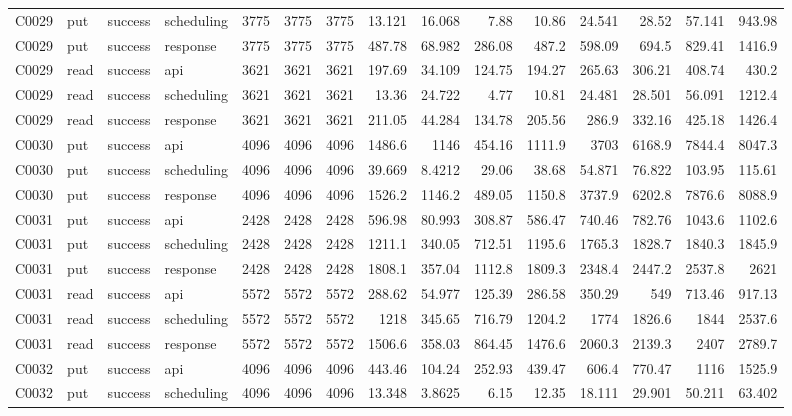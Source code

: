 \begin{landscape}
\begin{longtable}{llllrrrrrrrrrrr}
C0029 & put & success & scheduling & 3775 & 3775 & 3775 & 13.121 & 16.068 & 7.88 & 10.86 & 24.541 & 28.52 & 57.141 & 943.98\\
C0029 & put & success & response & 3775 & 3775 & 3775 & 487.78 & 68.982 & 286.08 & 487.2 & 598.09 & 694.5 & 829.41 & 1416.9\\
C0029 & read & success & api & 3621 & 3621 & 3621 & 197.69 & 34.109 & 124.75 & 194.27 & 265.63 & 306.21 & 408.74 & 430.2\\
C0029 & read & success & scheduling & 3621 & 3621 & 3621 & 13.36 & 24.722 & 4.77 & 10.81 & 24.481 & 28.501 & 56.091 & 1212.4\\
C0029 & read & success & response & 3621 & 3621 & 3621 & 211.05 & 44.284 & 134.78 & 205.56 & 286.9 & 332.16 & 425.18 & 1426.4\\
C0030 & put & success & api & 4096 & 4096 & 4096 & 1486.6 & 1146 & 454.16 & 1111.9 & 3703 & 6168.9 & 7844.4 & 8047.3\\
C0030 & put & success & scheduling & 4096 & 4096 & 4096 & 39.669 & 8.4212 & 29.06 & 38.68 & 54.871 & 76.822 & 103.95 & 115.61\\
C0030 & put & success & response & 4096 & 4096 & 4096 & 1526.2 & 1146.2 & 489.05 & 1150.8 & 3737.9 & 6202.8 & 7876.6 & 8088.9\\
C0031 & put & success & api & 2428 & 2428 & 2428 & 596.98 & 80.993 & 308.87 & 586.47 & 740.46 & 782.76 & 1043.6 & 1102.6\\
C0031 & put & success & scheduling & 2428 & 2428 & 2428 & 1211.1 & 340.05 & 712.51 & 1195.6 & 1765.3 & 1828.7 & 1840.3 & 1845.9\\
C0031 & put & success & response & 2428 & 2428 & 2428 & 1808.1 & 357.04 & 1112.8 & 1809.3 & 2348.4 & 2447.2 & 2537.8 & 2621\\
C0031 & read & success & api & 5572 & 5572 & 5572 & 288.62 & 54.977 & 125.39 & 286.58 & 350.29 & 549 & 713.46 & 917.13\\
C0031 & read & success & scheduling & 5572 & 5572 & 5572 & 1218 & 345.65 & 716.79 & 1204.2 & 1774 & 1826.6 & 1844 & 2537.6\\
C0031 & read & success & response & 5572 & 5572 & 5572 & 1506.6 & 358.03 & 864.45 & 1476.6 & 2060.3 & 2139.3 & 2407 & 2789.7\\
C0032 & put & success & api & 4096 & 4096 & 4096 & 443.46 & 104.24 & 252.93 & 439.47 & 606.4 & 770.47 & 1116 & 1525.9\\
C0032 & put & success & scheduling & 4096 & 4096 & 4096 & 13.348 & 3.8625 & 6.15 & 12.35 & 18.111 & 29.901 & 50.211 & 63.402\\

\end{longtable}
\end{landscape}
